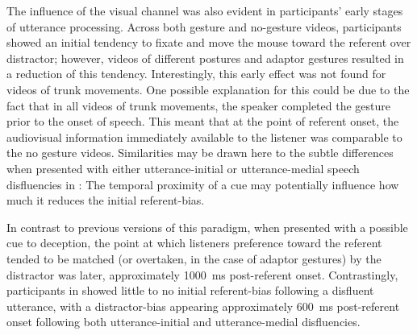 \documentclass[a4paper,man,natbib]{apa6}
\begin{document}
The influence of the visual channel was also evident in participants' early stages of utterance processing. 
Across both gesture and no-gesture videos, participants showed an initial tendency to fixate and move the mouse toward the referent over distractor; however, videos of different postures and adaptor gestures resulted in a reduction of this tendency.
Interestingly, this early effect was not found for videos of trunk movements. %
One possible explanation for this could be due to the fact that in all videos of trunk movements, the speaker completed the gesture prior to the onset of speech.
This meant that at the point of referent onset, the audiovisual information immediately available to the listener was comparable to the no gesture videos. %
Similarities may be drawn here to the subtle differences when presented with either utterance-initial or utterance-medial speech disfluencies in \citet{Loy2017}: The temporal proximity of a cue may potentially influence how much it reduces the initial referent-bias. 
 
In contrast to previous versions of this paradigm, when presented with a possible cue to deception, the point at which listeners preference toward the referent tended to be matched (or overtaken, in the case of adaptor gestures) by the distractor was later, approximately 1000~ms post-referent onset. %
Contrastingly, participants in \citeauthor{Loy2017} showed little to no initial referent-bias following a disfluent utterance, with a distractor-bias appearing approximately 600~ms post-referent onset following both utterance-initial and utterance-medial disfluencies. 
\end{document}
